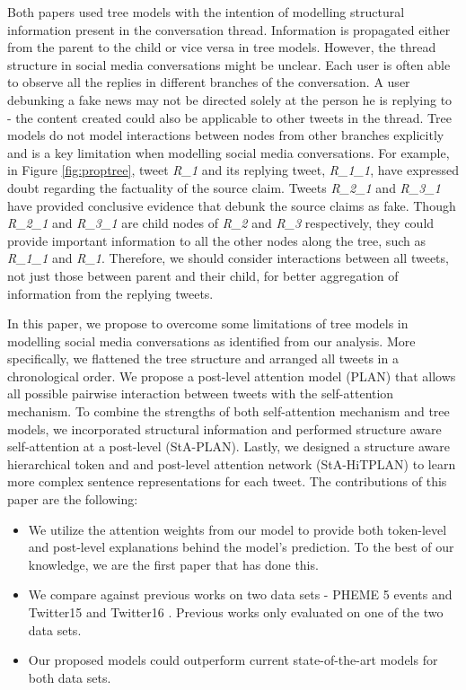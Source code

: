 \documentclass[letterpaper]{article} %
\begin{document}
Both papers used tree models with the intention of modelling structural information present in the conversation thread. Information is propagated either from the parent to the child or vice versa in tree models. However, the thread structure in social media conversations might be unclear. Each user is often able to observe all the replies in different branches of the conversation. A user debunking a fake news may not be directed solely at the person he is replying to - the content created could also be applicable to other tweets in the thread. Tree models do not model interactions between nodes from other branches explicitly and is a key limitation when modelling social media conversations. For example, in Figure \ref{fig:proptree}, tweet \textit{R\_1} and its replying tweet, \textit{R\_1\_1}, have expressed doubt regarding the factuality of the source claim. Tweets \textit{R\_2\_1} and \textit{R\_3\_1} have provided conclusive evidence that debunk the source claims as fake. Though \textit{R\_2\_1} and \textit{R\_3\_1} are child nodes of \textit{R\_2} and \textit{R\_3} respectively, they could provide important information to all the other nodes along the tree, such as \textit{R\_1\_1} and \textit{R\_1}. Therefore, we should consider interactions between all tweets, not just those between parent and their child, for better aggregation of information from the replying tweets.

In this paper, we propose to overcome some limitations of tree models in modelling social media conversations as identified from our analysis. More specifically, we flattened the tree structure and arranged all tweets in a chronological order. We propose a post-level attention model (PLAN) that allows all possible pairwise interaction between tweets with the self-attention mechanism. To combine the strengths of both self-attention mechanism and tree models, we incorporated structural information and performed structure aware self-attention at a post-level (StA-PLAN). Lastly, we designed a structure aware hierarchical token and and post-level attention network (StA-HiTPLAN) to learn more complex sentence representations for each tweet. \newline
\newline
The contributions of this paper are the following:
\begin{itemize}
    \item We utilize the attention weights from our model to provide both token-level and post-level explanations behind the model's prediction. To the best of our knowledge, we are the first paper that has done this.
    \item We compare against previous works on two data sets - PHEME 5 events \cite{kochkina_liakata_zubiaga_2018} and Twitter15 and Twitter16 \cite{ma17}. Previous works only evaluated on one of the two data sets.
    \item  Our proposed models could outperform current state-of-the-art models for both data sets.
\end{itemize}
\end{document}
